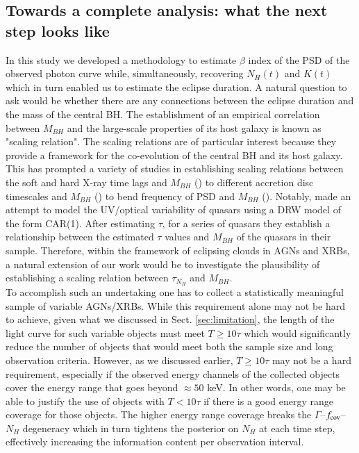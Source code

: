 \documentclass{aa}
\begin{document}
\subsection{Towards a complete analysis: what the next step looks like}
\label{sec:discuss_future_work}
In this study we developed a methodology to estimate $\beta$ index of the PSD of the observed photon curve while, simultaneously, recovering $N_H(t)$ and $K(t)$ which in turn enabled us to estimate the eclipse duration. A natural question to ask would be whether there are any connections between the eclipse duration and the mass of the central BH. The establishment of an empirical correlation between $M_{BH}$ and the large-scale properties of its host galaxy is known as "scaling relation". The scaling relations are of particular interest because they provide a framework for the co-evolution of the central BH and its host galaxy. This has prompted a variety of studies in establishing scaling relations between the soft and hard X-ray time lags and $M_{BH}$ (\citealt{Mallick2021}) to different accretion disc timescales and $M_{BH}$ (\citealt{Kelly2009}) to bend frequency of PSD and $M_{BH}$ (\citealt{GonzalezMartinVaughan2012}). Notably, \citet{Kelly2009} made an attempt to model the UV/optical variability of quasars using a DRW model of the form CAR(1). After estimating $\tau$, for a series of quasars they establish a relationship between the estimated $\tau$ values and $M_{BH}$ of the quasars in their sample. Therefore, within the framework of eclipsing clouds in AGNs and XRBs, a natural extension of our work would be to investigate the plausibility of establishing a scaling relation between $\tau_{N_H}$ and $M_{BH}$. \\
To accomplish such an undertaking one has to collect a statistically meaningful sample of variable AGNs/XRBs. While this requirement alone may not be hard to achieve, given what we discussed in Sect. \ref{sec:limitation}, the length of the light curve for such variable objects must meet $T \ge 10\tau$ which would significantly reduce the number of objects that would meet both the sample size and long observation criteria. However, as we discussed earlier, $T \ge 10\tau$ may not be a hard requirement, especially if the observed energy channels of the collected objects cover the energy range that goes beyond $\approx 50$ keV. In other words, one may be able to justify the use of objects with $ T < 10\tau$ if there is a good energy range coverage for those objects. The higher energy range coverage breaks the $\Gamma$–$f_{\rm cov}$–$N_H$ degeneracy which in turn tightens the posterior on $N_H$ at each time step, effectively increasing the information content per observation interval. \\
\end{document}

